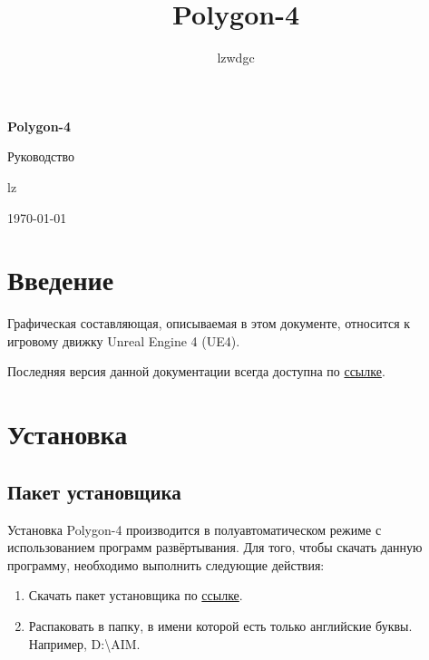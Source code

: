 \documentclass[a4paper,12pt]{report}
\author{lzwdgc}
\title{Polygon-4}
\newcommand{\ue}{UE4\xspace}
\newcommand{\pf}{Polygon-4\xspace}
\begin{document}
\large %

\begin{titlepage}
\centering
\vspace*{7cm}
{\huge\bfseries Polygon-4\par}
\vspace{1.5cm}
{\Large Руководство\par}
\vspace{1.5cm}
lz
\vfill
{\today\par}
\end{titlepage}
\setcounter{page}{2}
\tableofcontents

\chapter*{Введение}

Графическая составляющая, описываемая в этом документе, относится к игровому движку Unreal Engine 4 (\ue).

Последняя версия данной документации всегда доступна по \href{https://www.dropbox.com/s/ipnakg5civ0xp0g/Polygon4_ru.pdf?dl=1}{ссылке}.

\chapter{Установка}

\section{Пакет установщика}


\begin{comment}
\textbf{ВАЖНО!} Для корректной работы \pf и любых утилит требуется скачать и установить пакеты Visual C++ Redistributable for Visual Studio 2017 (\href{https://download.microsoft.com/download/9/3/F/93FCF1E7-E6A4-478B-96E7-D4B285925B00/vc_redist.x86.exe}{32 бита}, \href{https://download.microsoft.com/download/9/3/F/93FCF1E7-E6A4-478B-96E7-D4B285925B00/vc_redist.x64.exe}{64 бита}).
Обязательна установка 32 битной версии пакета.
Может потребоваться одновременная установка обеих версий.
\end{comment}

Установка \pf производится в полуавтоматическом режиме с использованием программ развёртывания.
Для того, чтобы скачать данную программу, необходимо выполнить следующие действия:

\begin{enumerate}
\item Скачать пакет установщика по \href{https://www.dropbox.com/s/0zhbgb1ftspcv9w/polygon4.zip?dl=1}{ссылке}.
\item Распаковать в папку, в имени которой есть только английские буквы. Например, D:\backslash AIM.
\end{enumerate}
\end{document}

